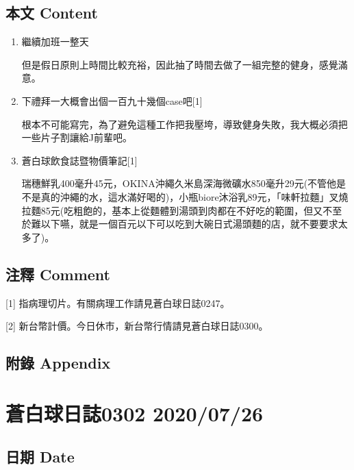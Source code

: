 \documentclass[
]{article}
\begin{document}
\hypertarget{ux672cux6587-content-24}{%
\subsection{本文 Content}\label{ux672cux6587-content-24}}

\begin{enumerate}
\def\labelenumi{\arabic{enumi}.}
\item
  繼續加班一整天

  但是假日原則上時間比較充裕，因此抽了時間去做了一組完整的健身，感覺滿意。
\item
  下禮拜一大概會出個一百九十幾個case吧{[}1{]}

  根本不可能寫完，為了避免這種工作把我壓垮，導致健身失敗，我大概必須把一些片子割讓給J前輩吧。
\item
  蒼白球飲食誌暨物價筆記{[}1{]}

  瑞穗鮮乳400毫升45元，OKINA沖繩久米島深海微礦水850毫升29元(不管他是不是真的沖繩的水，這水滿好喝的)，小瓶biore沐浴乳89元，「味軒拉麵」叉燒拉麵85元(吃粗飽的，基本上從麵體到湯頭到肉都在不好吃的範圍，但又不至於難以下嚥，就是一個百元以下可以吃到大碗日式湯頭麵的店，就不要要求太多了)。
\end{enumerate}

\hypertarget{ux6ce8ux91cb-comment-24}{%
\subsection{注釋 Comment}\label{ux6ce8ux91cb-comment-24}}

{[}1{]} 指病理切片。有關病理工作請見蒼白球日誌0247。

{[}2{]} 新台幣計價。今日休市，新台幣行情請見蒼白球日誌0300。

\hypertarget{ux9644ux9304-appendix-24}{%
\subsection{附錄 Appendix}\label{ux9644ux9304-appendix-24}}

\hypertarget{ux84bcux767dux7403ux65e5ux8a8c0302-20200726}{%
\section{蒼白球日誌0302
2020/07/26}\label{ux84bcux767dux7403ux65e5ux8a8c0302-20200726}}

\hypertarget{ux65e5ux671f-date-25}{%
\subsection{日期 Date}\label{ux65e5ux671f-date-25}}
\end{document}
